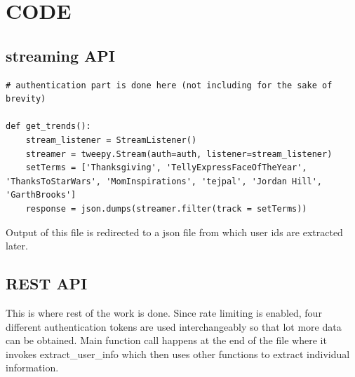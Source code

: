 \documentclass[11pt]{article}
\begin{document}
\section{CODE}

\subsection{streaming API}

\begin{lstlisting}
# authentication part is done here (not including for the sake of brevity)

def get_trends():
	stream_listener = StreamListener()
	streamer = tweepy.Stream(auth=auth, listener=stream_listener)
	setTerms = ['Thanksgiving', 'TellyExpressFaceOfTheYear', 'ThanksToStarWars', 'MomInspirations', 'tejpal', 'Jordan Hill', 'GarthBrooks']
	response = json.dumps(streamer.filter(track = setTerms))

\end{lstlisting}

Output of this file is redirected to a json file from which user ids are extracted later.

\subsection{REST API}

This is where rest of the work is done. Since rate limiting is enabled, four different authentication tokens are used interchangeably so that lot more data can be obtained. Main function call happens at the end of the file where it invokes extract\_user\_info which then uses other functions to extract individual information. 
\end{document}
